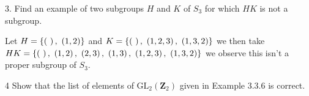 \newpage
\begin{mdframed}[style=darkQuesion]
  3.  Find an example of two subgroups $H$ and $K$ of $S_{3}$ for which $H K$ is not a subgroup.

\end{mdframed}
\begin{mdframed}[style=darkAnswer,frametitle={Joe Starr}]
  Let $H=\left\{\left(\ \right),\ \left(1,2\right)\right\}$ and 
  $K=\lrs{\lrp{\ },\ \lrp{1,2,3},\ \lrp{1,3,2}}$ we then
  take \\
  $HK= \lrs{\lrp{\ },\ \lrp{1,2},\ \lrp{2,3},\ 
            \lrp{1,3},\ \lrp{1,2,3},\ \lrp{1,3,2}}$
  we observe this isn't a proper subgroup of $S_3$.
\end{mdframed}
\newpage
\begin{mdframed}[style=darkQuesion]
  4 Show that the list of elements of $\mathrm{GL}_{2}\left(\mathbf{Z}_{2}\right)$ given in Example 3.3.6 is correct.
\end{mdframed}
